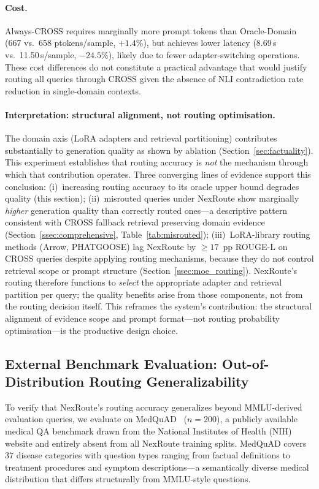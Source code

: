 \documentclass[a4paper,fleql,doubleblind]{cas-sc}
\begin{document}
\paragraph{Cost.}
Always-CROSS requires marginally more prompt tokens than Oracle-Domain
(667 vs.\ 658 ptokens/sample, $+1.4$\%), but achieves lower latency
(8.69\,s vs.\ 11.50\,s/sample, $-24.5$\%), likely due to fewer adapter-switching
operations.
These cost differences do not constitute a practical advantage that would justify
routing all queries through CROSS given the absence of NLI contradiction rate reduction
in single-domain contexts.

\paragraph{Interpretation: structural alignment, not routing optimisation.}
The domain axis (LoRA adapters and retrieval partitioning) contributes
substantially to generation quality as shown by ablation (Section~\ref{sec:factuality}).
This experiment establishes that routing accuracy is \emph{not} the mechanism through
which that contribution operates.
Three converging lines of evidence support this conclusion:
(i)~increasing routing accuracy to its oracle upper bound degrades quality (this section);
(ii)~misrouted queries under NexRoute show marginally \emph{higher} generation quality
than correctly routed ones---a descriptive pattern consistent with CROSS fallback
retrieval preserving domain evidence
(Section~\ref{ssec:comprehensive}, Table~\ref{tab:misrouted});
(iii)~LoRA-library routing methods (Arrow, PHATGOOSE) lag NexRoute by ${\geq}17$~pp
ROUGE-L on CROSS queries despite applying routing mechanisms, because they do not
control retrieval scope or prompt structure (Section~\ref{ssec:moe_routing}).
NexRoute's routing therefore functions to \emph{select} the appropriate adapter and
retrieval partition per query; the quality benefits arise from those components,
not from the routing decision itself.
This reframes the system's contribution: the structural alignment of evidence scope
and prompt format---not routing probability optimisation---is the productive design choice.

\subsection{External Benchmark Evaluation: Out-of-Distribution Routing Generalizability}
\label{ssec:external}
To verify that NexRoute's routing accuracy generalizes beyond MMLU-derived evaluation
queries, we evaluate on MedQuAD~\citep{ben2019question} ($n{=}200$), a publicly
available medical QA benchmark drawn from the National Institutes of Health (NIH)
website and entirely absent from all NexRoute training splits.
MedQuAD covers 37 disease categories with question types ranging from factual
definitions to treatment procedures and symptom descriptions---a semantically diverse
medical distribution that differs structurally from MMLU-style questions.
\end{document}
